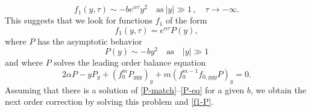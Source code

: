 \documentclass{article}%
\newcommand{\alp}{\alpha}
\begin{document}
 \[
f_1(y,\tau) \sim - be^{\alp\tau}y^{2}\quad\text{as}\ |y| \gg1\,,\quad
 \tau\to-\infty.
\] 
This suggests that we look for functions $f_1$ of the form
\begin{equation}\label{f1-P}
 f_1(y,\tau) =e^{\alp\tau}P(y),
 \end{equation}
 where $P$ has the asymptotic behavior
 \begin{equation}\label{P-match}
 P(y) \sim - by^{2}\quad \text{as}\quad |y|\gg1
 \end{equation}
 and where $P$ solves the leading order balance equation
 \begin{equation}\label{P-eq}
 2 \alp P - yP_{y} + (f_{0}^{m}P_{yyy})_{y} + m(f_{0}^{m-1}f_{0,yyy}P)_{y}=0.
 \end{equation}
 Assuming that there is a solution of \eqref{P-match}--\eqref{P-eq} for a given $b$, 
we obtain the next order correction by solving this problem and \eqref{f1-P}.
\end{document}

